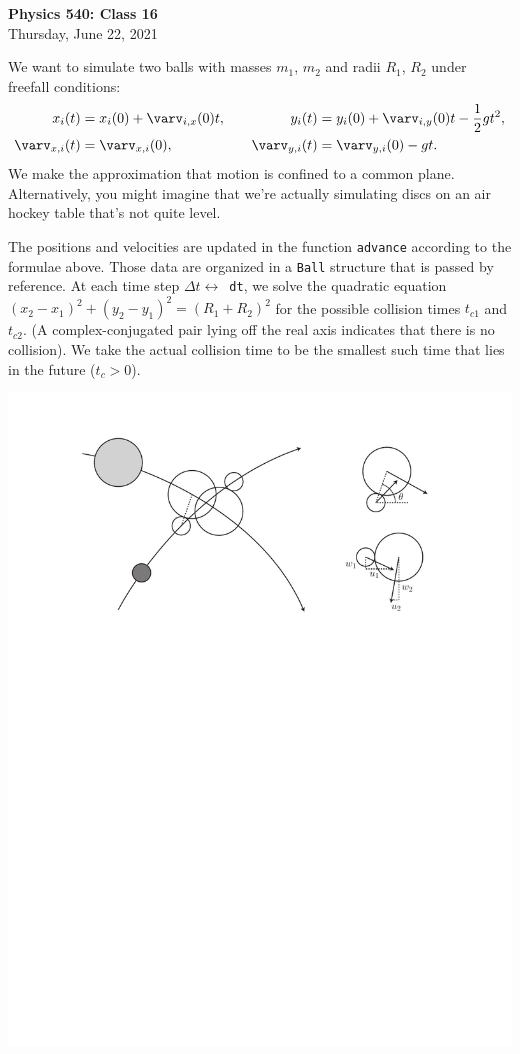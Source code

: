 \documentclass[11pt]{article}
\begin{document}
\begin{center}
{\large\bf Physics 540: Class 16}\\
   {\small Thursday, June 22, 2021}

\end{center}

We want to simulate two balls with masses $m_1$, $m_2$ and radii $R_1$, $R_2$ under freefall conditions:
\begin{alignat*}{2} x_i(t) &= x_i(0) + \varv_{i,x}(0)t, \ \ \ & y_i(t) &= y_i(0) + \varv_{i,y}(0)t - \frac{1}{2}gt^2,\\
\varv_{x,i}(t) &= \varv_{x,i}(0), &\varv_{y,i}(t) &= \varv_{y,i}(0) - gt.
\end{alignat*}
We make the approximation that motion is confined to a common plane. Alternatively, you might imagine that we're actually simulating discs on an air hockey table that's not quite level.

The positions and velocities are updated in the function \verb!advance! according to the formulae above. Those data are organized in a \verb!Ball! structure that is passed by  reference. At each time step $\Delta t \leftrightarrow $~\verb!dt!, we 
solve the quadratic equation $(x_2-x_1)^2 + (y_2-y_1)^2 = (R_1+R_2)^2$
for the possible collision times $t_{c1}$ and $t_{c2}$. (A complex-conjugated pair lying off the real axis indicates that there is no collision).
We take the actual collision time to be the smallest such time that lies in the future ($t_c > 0$).

\begin{center}
\includegraphics[scale=0.8]{collision.pdf}
\end{center}
\end{document}
